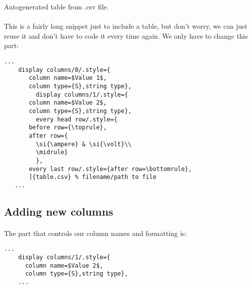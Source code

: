   \begin{table}[h!]
    \begin{center}
      \caption{Autogenerated table from .csv file.}
      \label{table1}
    \end{center}
  \end{table}
  \paragraph{}
  This is a fairly long snippet just to include a table, but don't worry, we can just reuse it and don't have to code it every time again. We only have to change this part:
  \begin{lstlisting}[language={[LaTeX]TeX},breaklines=true,frame=single]
    ...
    display columns/0/.style={
       column name=$Value 1$,
       column type={S},string type},
         display columns/1/.style={
       column name=$Value 2$,
       column type={S},string type},
         every head row/.style={
       before row={\toprule},
       after row={
         \si{\ampere} & \si{\volt}\\
         \midrule}
         },
       every last row/.style={after row=\bottomrule},
       ]{table.csv} % filename/path to file
   ...
  \end{lstlisting}

  \subsection{Adding new columns}
  \paragraph{}
  The part that controls our column names and formatting is:
  \begin{lstlisting}[language={[LaTeX]TeX},breaklines=true,frame=single]
    ...
    display columns/1/.style={
      column name=$Value 2$,
      column type={S},string type},
    ...
  \end{lstlisting}
